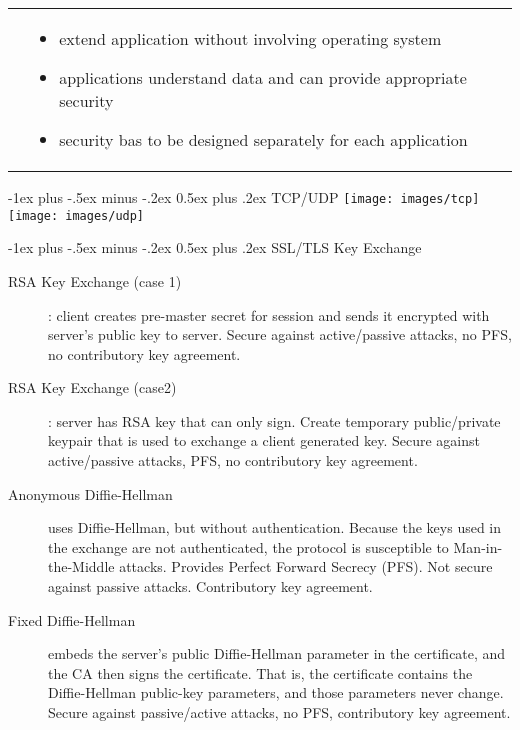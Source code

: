 \documentclass[a4paper,twocolumn]{article}
\makeatletter
\newenvironment{itemization}[1][\small]{%
    \begin{itemize}[leftmargin=*]
            #1
        }{%
    \end{itemize}
}
\newcommand{\rot}[1]{%
    \rotatebox{90}{%
        \kern-0.3em #1
    }
}
\renewcommand{\section}{%
    \@startsection{section}{1}{0mm}%
    {-1ex plus -.5ex minus -.2ex}%
    {0.5ex plus .2ex}%
    {\normalfont\normalsize\bfseries\sectionrule{12pt}{0.4pt}{0pt}{0pt}}
}
\makeatother
\begin{document}
\begin{footnotesize}
\begin{table}[h]
\begin{tabular}{m{} | p{}}
            \hline
            \rot{Application} & 
            \parbox{0.38\textwidth}{%
                \begin{itemization}
                \item extend application without involving operating system 
                \item applications understand data and can provide appropriate security
                    \color{red}
                \item security bas to be designed separately for each application
                \end{itemization}}\\
        \end{tabular}
    \end{table}
    
\section{TCP/UDP}
\texttt{[image: images/tcp]}
\texttt{[image: images/udp]}

\section{SSL/TLS Key Exchange}
\begin{description}
\item[RSA Key Exchange (case 1)]: client creates pre-master secret for session and sends it encrypted with server's public key to server. Secure against active/passive attacks, no PFS, no contributory key agreement.

\item[RSA Key Exchange (case2)]: server has RSA key that can only sign. Create temporary public/private keypair that is used to exchange a client generated key. Secure against active/passive attacks, PFS, no contributory key agreement.

\item[Anonymous Diffie-Hellman] uses Diffie-Hellman, but without authentication. Because the keys used in the exchange are not authenticated, the protocol is susceptible to Man-in-the-Middle attacks. Provides Perfect Forward Secrecy (PFS). Not secure against passive attacks. Contributory key agreement.

\item[Fixed Diffie-Hellman] embeds the server's public Diffie-Hellman parameter in the certificate, and the CA then signs the certificate. That is, the certificate contains the Diffie-Hellman public-key parameters, and those parameters never change. Secure against passive/active attacks, no PFS, contributory key agreement.


\end{description}
\end{footnotesize}
\end{document}
